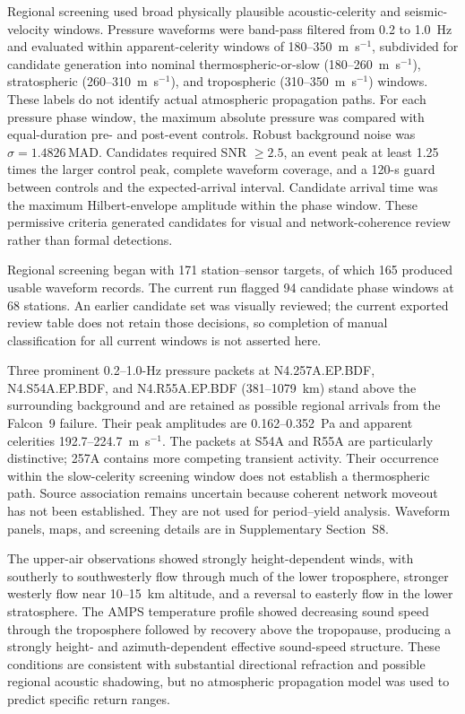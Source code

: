 \documentclass[]{seismica}
\begin{document}
Regional screening used broad physically plausible acoustic-celerity and
seismic-velocity windows. Pressure waveforms were band-pass filtered from 0.2
to 1.0~Hz and evaluated within apparent-celerity windows of
180--350~m~s$^{-1}$, subdivided for candidate generation into nominal
thermospheric-or-slow (180--260~m~s$^{-1}$), stratospheric
(260--310~m~s$^{-1}$), and tropospheric (310--350~m~s$^{-1}$) windows. These
labels do not identify actual atmospheric propagation paths. For each pressure
phase window, the maximum absolute pressure was compared with equal-duration
pre- and post-event controls. Robust background noise was
$\sigma=1.4826\,\mathrm{MAD}$. Candidates required SNR $\geq2.5$, an event
peak at least 1.25 times the larger control peak, complete waveform coverage,
and a 120-s guard between controls and the expected-arrival interval. Candidate
arrival time was the maximum Hilbert-envelope amplitude within the phase
window. These permissive criteria generated candidates for visual and
network-coherence review rather than formal detections.

Regional screening began with 171 station--sensor targets, of which 165
produced usable waveform records. The current run flagged 94 candidate phase
windows at 68 stations. An earlier candidate set was visually reviewed; the
current exported review table does not retain those decisions, so completion
of manual classification for all current windows is not asserted here.

Three prominent 0.2--1.0-Hz pressure packets at N4.257A.EP.BDF,
N4.S54A.EP.BDF, and N4.R55A.EP.BDF (381--1079~km) stand above the surrounding
background and are retained as possible regional arrivals from the Falcon~9
failure. Their peak amplitudes are 0.162--0.352~Pa and apparent celerities
192.7--224.7~m~s$^{-1}$. The packets at S54A and R55A are particularly
distinctive; 257A contains more competing transient activity. Their occurrence
within the slow-celerity screening window does not establish a thermospheric
path. Source association remains uncertain because coherent network moveout
has not been established. They are not used for period--yield analysis.
Waveform panels, maps, and screening details are in Supplementary Section~S8.

The upper-air observations showed strongly height-dependent winds, with
southerly to southwesterly flow through much of the lower troposphere, stronger
westerly flow near 10--15~km altitude, and a reversal to easterly flow in the
lower stratosphere. The AMPS temperature profile showed decreasing sound speed
through the troposphere followed by recovery above the tropopause, producing a
strongly height- and azimuth-dependent effective sound-speed structure. These
conditions are consistent with substantial directional refraction and possible
regional acoustic shadowing, but no atmospheric propagation model was used to
predict specific return ranges.
\end{document}
